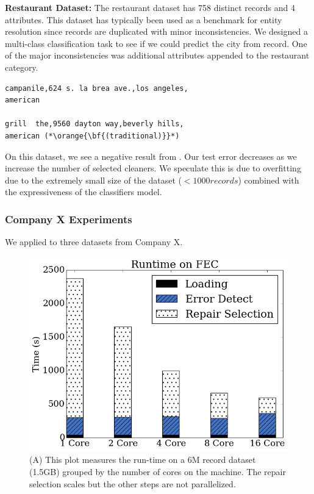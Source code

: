 \vspace{0.5em}\noindent\textbf{Restaurant Dataset: } The restaurant dataset has 758 distinct records and 4 attributes. This dataset has typically been used as a benchmark for entity resolution since records are duplicated with minor inconsistencies.
We designed a multi-class classification task to see if we could predict the city from record.
One of the major inconsistencies was additional attributes appended to the restaurant category.

\begin{lstlisting}
campanile,624 s. la brea ave.,los angeles,
american

grill  the,9560 dayton way,beverly hills,
american (*\orange{\bf{(traditional)}}*)
\end{lstlisting}

On this dataset, we see a negative result from \sys. Our test error decreases as we increase the number of selected cleaners. We speculate this is due to overfitting due to the extremely small size of the dataset  ($<1000 records$) combined with the expressiveness of the classifiers model.

\subsubsection{Company X Experiments}
We applied \sys to three datasets from Company X.


\begin{figure}[t]
\centering
\includegraphics[width=0.8\columnwidth]{exp/runtime.png}
\caption{(A) This plot measures the run-time on a 6M record dataset (1.5GB) grouped by the number of cores on the machine. The repair selection scales but the other steps are not parallelized.\label{exp:runtime}}
\end{figure}

